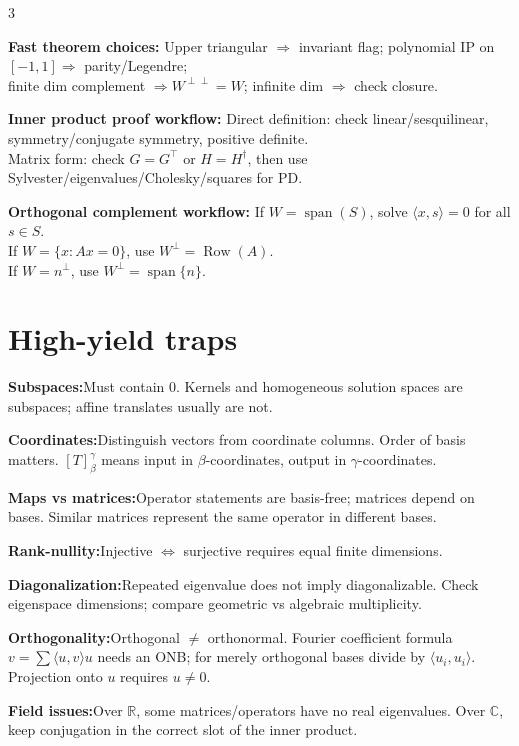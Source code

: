 \documentclass[10pt]{article}
\newcommand{\R}{\mathbb{R}}
\newcommand{\C}{\mathbb{C}}
\newcommand{\Row}{\operatorname{Row}}
\newcommand{\spann}{\operatorname{span}}
\newcommand{\ip}[2]{\langle #1,#2\rangle}
\newenvironment{cheatitems}{\par\vspace{-1pt}}{\par\vspace{-1pt}}
\newcommand{\cheatrow}[2]{%
  \par\noindent\textbf{#1:}\nobreak\enspace #2\par
}
\begin{document}
\begin{multicols}{3}
\begin{cheatitems}
\cheatrow{Fast theorem choices}{
Upper triangular $\Rightarrow$ invariant flag; 
polynomial IP on $[-1,1]\Rightarrow$ parity/Legendre;\\
finite dim complement $\Rightarrow W^{\perp\perp}=W$; 
infinite dim $\Rightarrow$ check closure.
}

\cheatrow{Inner product proof workflow}{
Direct definition: check linear/sesquilinear, symmetry/conjugate symmetry, positive definite.\\
Matrix form: check $G=G^\top$ or $H=H^\dagger$, then use Sylvester/eigenvalues/Cholesky/squares for PD.
}

\cheatrow{Orthogonal complement workflow}{
If $W=\spann(S)$, solve $\ip{x}{s}=0$ for all $s\in S$.\\
If $W=\{x:Ax=0\}$, use $W^\perp=\Row(A)$.\\
If $W=n^\perp$, use $W^\perp=\spann\{n\}$.
}

\end{cheatitems}



\section*{High-yield traps}
\begin{cheatitems}
\cheatrow{Subspaces}{Must contain $0$. Kernels and homogeneous solution spaces are subspaces; affine translates usually are not.}
\cheatrow{Coordinates}{Distinguish vectors from coordinate columns. Order of basis matters. $[T]^\gamma_\beta$ means input in $\beta$-coordinates, output in $\gamma$-coordinates.}
\cheatrow{Maps vs matrices}{Operator statements are basis-free; matrices depend on bases. Similar matrices represent the same operator in different bases.}
\cheatrow{Rank-nullity}{Injective $\Leftrightarrow$ surjective requires equal finite dimensions.}
\cheatrow{Diagonalization}{Repeated eigenvalue does not imply diagonalizable. Check eigenspace dimensions; compare geometric vs algebraic multiplicity.}
\cheatrow{Orthogonality}{Orthogonal $\neq$ orthonormal. Fourier coefficient formula $v=\sum\ip{u}{v}u$ needs an ONB; for merely orthogonal bases divide by $\ip{u_i}{u_i}$. Projection onto $u$ requires $u\neq 0$.}
\cheatrow{Field issues}{Over $\R$, some matrices/operators have no real eigenvalues. Over $\C$, keep conjugation in the correct slot of the inner product.}
\end{cheatitems}

\end{multicols}
\end{document}

